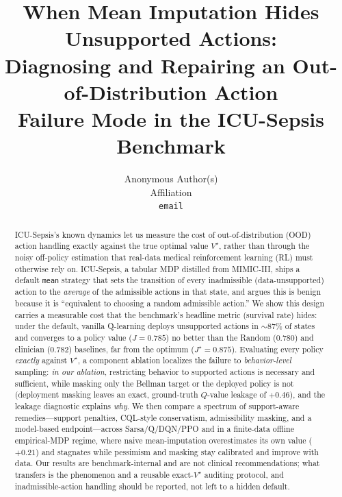 \documentclass{article}
\title{When Mean Imputation Hides Unsupported Actions:\\
Diagnosing and Repairing an Out-of-Distribution Action\\
Failure Mode in the ICU-Sepsis Benchmark}
\author{%
  Anonymous Author(s)\\
  Affiliation\\
  \texttt{email}\\
}
\begin{document}
\maketitle

\begin{abstract}
ICU-Sepsis's known dynamics let us measure the cost of out-of-distribution (OOD)
action handling exactly against the true optimal value $V^\star$, rather than
through the noisy off-policy estimation that real-data medical reinforcement
learning (RL) must otherwise rely on. ICU-Sepsis, a tabular MDP distilled from
MIMIC-III, ships a default \texttt{mean} strategy that sets the transition of
every inadmissible (data-unsupported) action to the \emph{average} of the
admissible actions in that state, and argues this is benign because it is
``equivalent to choosing a random admissible action.'' We show this design
carries a measurable cost that the benchmark's headline metric (survival rate)
hides: under the default, vanilla Q-learning deploys unsupported actions in
$\sim$87\% of states and converges to a policy value ($J{=}0.785$) no better than
the Random (0.780) and clinician (0.782) baselines, far from the optimum
($J^\star{=}0.875$). Evaluating every policy \emph{exactly} against $V^\star$, a
component ablation localizes the failure to \emph{behavior-level} sampling:
\emph{in our ablation}, restricting behavior to supported actions is necessary
and sufficient, while masking only the Bellman target or the deployed policy is
not (deployment masking leaves an exact, ground-truth $Q$-value leakage of
$+0.46$), and the leakage diagnostic explains \emph{why}. We then compare a
spectrum of support-aware remedies---support penalties, CQL-style conservatism,
admissibility masking, and a model-based endpoint---across Sarsa/Q/DQN/PPO and in
a finite-data offline empirical-MDP regime, where naive mean-imputation
overestimates its own value ($+0.21$) and stagnates while pessimism and masking
stay calibrated and improve with data. Our results are benchmark-internal and are
not clinical recommendations; what transfers is the phenomenon and a reusable
exact-$V^\star$ auditing protocol, and inadmissible-action handling should be
reported, not left to a hidden default.
\end{abstract}

\end{document}
